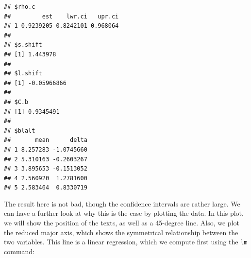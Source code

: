\documentclass[
]{article}
\newenvironment{Shaded}{\begin{snugshade}}{\end{snugshade}}
\newcommand{\AttributeTok}[1]{\textcolor[rgb]{0.77,0.63,0.00}{#1}}
\newcommand{\ConstantTok}[1]{\textcolor[rgb]{0.00,0.00,0.00}{#1}}
\newcommand{\DecValTok}[1]{\textcolor[rgb]{0.00,0.00,0.81}{#1}}
\newcommand{\FloatTok}[1]{\textcolor[rgb]{0.00,0.00,0.81}{#1}}
\newcommand{\FunctionTok}[1]{\textcolor[rgb]{0.00,0.00,0.00}{#1}}
\newcommand{\NormalTok}[1]{#1}
\newcommand{\OtherTok}[1]{\textcolor[rgb]{0.56,0.35,0.01}{#1}}
\newcommand{\SpecialCharTok}[1]{\textcolor[rgb]{0.00,0.00,0.00}{#1}}
\newcommand{\StringTok}[1]{\textcolor[rgb]{0.31,0.60,0.02}{#1}}
\begin{document}
\begin{Shaded}
\end{Shaded}

\begin{verbatim}
## $rho.c
##         est    lwr.ci   upr.ci
## 1 0.9239205 0.8242101 0.968064
## 
## $s.shift
## [1] 1.443978
## 
## $l.shift
## [1] -0.05966866
## 
## $C.b
## [1] 0.9345491
## 
## $blalt
##       mean      delta
## 1 8.257283 -1.0745660
## 2 5.310163 -0.2603267
## 3 3.895653 -0.1513052
## 4 2.560920  1.2781600
## 5 2.583464  0.8330719
\end{verbatim}

The result here is not bad, though the confidence intervals are rather large. We can have a further look at why this is the case by plotting the data. In this plot, we will show the position of the texts, as well as a 45-degree line. Also, we plot the reduced major axis, which shows the symmetrical relationship between the two variables. This line is a linear regression, which we compute first using the \texttt{lm} command:
\end{document}
